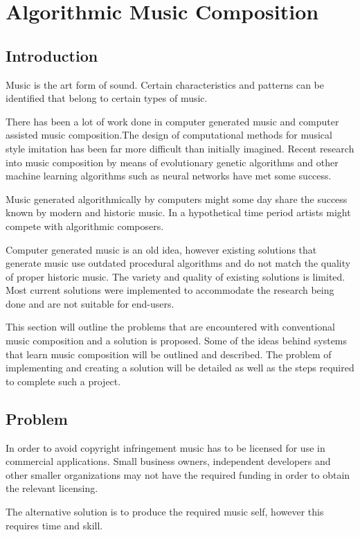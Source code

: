 \chapter{Algorithmic Music Composition}
\section{Introduction}
Music is the art form of sound. Certain characteristics and patterns can be identified that belong to certain types of music.


There has been a lot of work done in computer generated music and computer assisted music composition.The design of computational methods for musical style imitation has been far more difficult than initially imagined.
Recent research into music composition by means of evolutionary genetic algorithms and other machine learning algorithms such as neural networks have met some success.

Music generated algorithmically by computers might some day share the success known by modern and historic music. In a hypothetical time period artists might compete with algorithmic composers.

Computer generated music is an old idea, however existing solutions that generate music use outdated procedural algorithms and do not match the quality of proper historic music. The variety and quality of existing solutions is limited. Most current solutions were implemented to accommodate the research being done and are not suitable for end-users.

This section will outline the problems that are encountered with conventional music composition and a solution is proposed. Some of the ideas behind systems that learn music composition will be outlined and described. The problem of implementing and creating a solution will be detailed as well as the steps required to complete such a project.

\section{Problem}
In order to avoid copyright infringement music has to be licensed for use in commercial applications. Small business owners, independent developers and other smaller organizations may not have the required funding in order to obtain the relevant licensing.

The alternative solution is to produce the required music self, however this requires time and skill.

